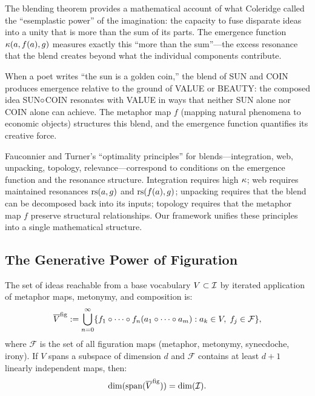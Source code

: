 \begin{interpretation}
\label{interp:blending}
The blending theorem provides a mathematical account of what Coleridge called
the ``esemplastic power'' of the imagination: the capacity to fuse disparate
ideas into a unity that is more than the sum of its parts.  The emergence
function $\kappa(a, f(a), g)$ measures exactly this ``more than the sum''---the
excess resonance that the blend creates beyond what the individual components
contribute.

When a poet writes ``the sun is a golden coin,'' the blend of SUN and COIN
produces emergence relative to the ground of VALUE or BEAUTY: the composed
idea SUN$\circ$COIN resonates with VALUE in ways that neither SUN alone
nor COIN alone can achieve.  The metaphor map $f$ (mapping natural phenomena
to economic objects) structures this blend, and the emergence function
quantifies its creative force.

Fauconnier and Turner's ``optimality principles'' for blends---integration,
web, unpacking, topology, relevance---correspond to conditions on the emergence
function and the resonance structure.  Integration requires high $\kappa$;
web requires maintained resonances $\mathrm{rs}(a, g)$ and $\mathrm{rs}(f(a), g)$; unpacking
requires that the blend can be decomposed back into its inputs; topology
requires that the metaphor map $f$ preserve structural relationships.  Our
framework unifies these principles into a single mathematical structure.
\end{interpretation}

\subsection{The Generative Power of Figuration}

\begin{theorem}
\label{thm:figurative-closure}
The set of ideas reachable from a base vocabulary $V \subset \mathcal{I}$ by iterated
application of metaphor maps, metonymy, and composition is:
\[
  \overline{V}^{\text{fig}} :=
  \bigcup_{n=0}^{\infty}
  \{f_1 \circ \cdots \circ f_n(a_1 \circ \cdots \circ a_m)
   : a_k \in V,\; f_j \in \mathcal{F}\},
\]
where $\mathcal{F}$ is the set of all figuration maps (metaphor, metonymy,
synecdoche, irony).  If $V$ spans a subspace of dimension $d$ and
$\mathcal{F}$ contains at least $d+1$ linearly independent maps, then:
\[
  \dim(\text{span}(\overline{V}^{\text{fig}})) = \dim(\mathcal{I}).
\]
\end{theorem}

